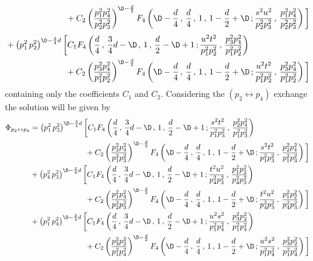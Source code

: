 \documentclass[a4paper,11pt,openright,twoside]{book}
\numberwithin{equation}{section}
\begin{document}
{\begin{align}
	&\hspace{2.5cm}+C_2\left(\frac{p_1^2p_4^2}{p_2^2p_3^2}\right)^{\D-\frac{d}{2}} F_4\left(\D-\frac{d}{4}\,,\,\frac{d}{4}\, ,\,1\,,\,1-\frac{d}{2}+\D\,;\frac{s^2u^2}{p_2^2p_3^2}\,,\,\frac{p_1^2p_4^2}{p_2^2p_3^2}\right)\bigg]\notag\\
\end{align}
\begin{align}
	&+\left(p_1^2\,p_2^2\right)^{\D-\frac{3}{4}d}\bigg[C_1 F_4\left(\frac{d}{4}\,,\,\frac{3}{4}d-\D\, ,\,1\,,\,\frac{d}{2}-\D+1\,;\frac{u^2t^2}{p_1^2p_2^2}\,,\,\frac{p_3^2p_4^2}{p_1^2p_2^2}\right)\notag\\
	&\hspace{2.5cm}+C_2\left(\frac{p_3^2p_4^2}{p_1^2p_2^2}\right)^{\D-\frac{d}{2}} F_4\left(\D-\frac{d}{4}\,,\,\frac{d}{4}\, ,\,1\,,\,1-\frac{d}{2}+\D\,;\frac{u^2t^2}{p_1^2p_2^2}\,,\,\frac{p_3^2p_4^2}{p_1^2p_2^2}\right)\bigg]\label{Phi1}
\end{align}
containing only the coefficients $C_1$ and $C_2$.  Considering the $(p_2\leftrightarrow p_4)$ exchange the solution will be given by
\begin{align}
	\Phi_{p_2\leftrightarrow p_4}&=\left(p_1^2\,p_3^2\right)^{\D-\frac{3}{4}d}\bigg[C_1 F_4\left(\frac{d}{4}\,,\,\frac{3}{4}d-\D\, ,\,1\,,\,\frac{d}{2}-\D+1\,;\frac{s^2t^2}{p_1^2p_3^2}\,,\,\frac{p_2^2p_4^2}{p_1^2p_3^2}\right)\notag\\
	&\hspace{2.5cm}+C_2\left(\frac{p_2^2p_4^2}{p_1^2p_3^2}\right)^{\D-\frac{d}{2}} F_4\left(\D-\frac{d}{4}\,,\,\frac{d}{4}\, ,\,1\,,\,1-\frac{d}{2}+\D\,;\frac{s^2t^2}{p_1^2p_3^2}\,,\,\frac{p_2^2p_4^2}{p_1^2p_3^2}\right)\bigg]\notag\\
	&+\left(p_4^2\,p_3^2\right)^{\D-\frac{3}{4}d}\bigg[C_1 F_4\left(\frac{d}{4}\,,\,\frac{3}{4}d-\D\, ,\,1\,,\,\frac{d}{2}-\D+1\,;\frac{t^2u^2}{p_4^2p_3^2}\,,\,\frac{p_1^2p_2^2}{p_4^2p_3^2}\right)\notag\\
	&\hspace{2.5cm}+C_2\left(\frac{p_1^2p_4^2}{p_2^2p_3^2}\right)^{\D-\frac{d}{2}} F_4\left(\D-\frac{d}{4}\,,\,\frac{d}{4}\, ,\,1\,,\,1-\frac{d}{2}+\D\,;\frac{t^2u^2}{p_4^2p_3^2}\,,\,\frac{p_1^2p_2^2}{p_4^2p_3^2}\right)\bigg]\notag\\
	&+\left(p_1^2\,p_4^2\right)^{\D-\frac{3}{4}d}\bigg[C_1 F_4\left(\frac{d}{4}\,,\,\frac{3}{4}d-\D\, ,\,1\,,\,\frac{d}{2}-\D+1\,;\frac{u^2s^2}{p_1^2p_4^2}\,,\,\frac{p_3^2p_2^2}{p_1^2p_4^2}\right)\notag\\
	&\hspace{2.5cm}+C_2\left(\frac{p_3^2p_2^2}{p_1^2p_4^2}\right)^{\D-\frac{d}{2}} F_4\left(\D-\frac{d}{4}\,,\,\frac{d}{4}\, ,\,1\,,\,1-\frac{d}{2}+\D\,;\frac{u^2s^2}{p_1^2p_4^2}\,,\,\frac{p_3^2p_2^2}{p_1^2p_4^2}\right)\bigg]

\end{align}}
\end{document}
